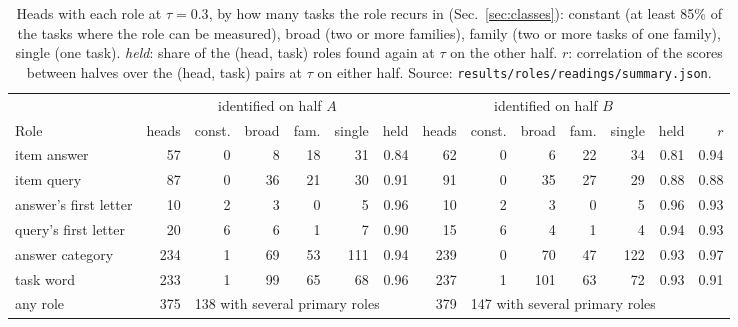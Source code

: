 \begin{table}[tbp]
\centering\small
\setlength{\tabcolsep}{4pt}
\begin{tabular}{@{}l rrrrrr rrrrrr r@{}}
\toprule
 & \multicolumn{6}{c}{identified on half $A$} & \multicolumn{6}{c}{identified on half $B$} & \\
\cmidrule(lr){2-7}\cmidrule(lr){8-13}
Role & heads & const. & broad & fam. & single & held & heads & const. & broad & fam. & single & held & $r$ \\
\midrule
item answer & 57 & 0 & 8 & 18 & 31 & 0.84 & 62 & 0 & 6 & 22 & 34 & 0.81 & 0.94 \\
item query & 87 & 0 & 36 & 21 & 30 & 0.91 & 91 & 0 & 35 & 27 & 29 & 0.88 & 0.88 \\
answer's first letter & 10 & 2 & 3 & 0 & 5 & 0.96 & 10 & 2 & 3 & 0 & 5 & 0.96 & 0.93 \\
query's first letter & 20 & 6 & 6 & 1 & 7 & 0.90 & 15 & 6 & 4 & 1 & 4 & 0.94 & 0.93 \\
answer category & 234 & 1 & 69 & 53 & 111 & 0.94 & 239 & 0 & 70 & 47 & 122 & 0.93 & 0.97 \\
task word & 233 & 1 & 99 & 65 & 68 & 0.96 & 237 & 1 & 101 & 63 & 72 & 0.93 & 0.91 \\
\midrule
any role & 375 & \multicolumn{5}{l}{138 with several primary roles} & 379 & \multicolumn{5}{l}{147 with several primary roles} & \\
\bottomrule
\end{tabular}
\caption{Heads with each role at $\tau=0.3$, by how many tasks the role recurs in (Sec.~\ref{sec:classes}): constant (at least 85\% of the tasks where the role can be measured), broad (two or more families), family (two or more tasks of one family), single (one task). \emph{held}: share of the (head, task) roles found again at $\tau$ on the other half. $r$: correlation of the scores between halves over the (head, task) pairs at $\tau$ on either half. Source: \texttt{results/roles/readings/summary.json}.}
\label{tab:classes}
\end{table}
